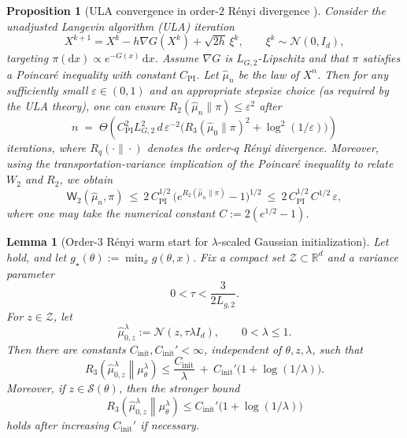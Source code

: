 \documentclass{article}
\theoremstyle{normaltheorem}
\newtheorem{lemma}[lemma]{Lemma}
\newtheorem{proposition}[proposition]{Proposition}
\newcommand{\gibbs}{\mu}
\newcommand{\R}{\mathbb{R}}
\newcommand{\calS}{\mathcal{S}}
\begin{document}
\begin{proposition}[ULA convergence in order-$2$ R\'enyi divergence {\citep[Prop.~5.6]{masiha2025superquantile}}]\label{prop:lmc-renyi}
Consider the unadjusted Langevin algorithm (ULA) iteration
\[
X^{k+1}=X^{k}-h\nabla G(X^{k})+\sqrt{2h}\,\xi^{k},
\qquad \xi^{k}\sim\mathcal N(0,I_d),
\]
targeting $\pi(\mathrm dx)\propto e^{-G(x)}\,\mathrm dx$.
Assume $\nabla G$ is $L_{G,2}$-Lipschitz and that $\pi$ satisfies a Poincar\'e inequality with constant $C_{\mathrm{PI}}$.
Let $\widehat\mu_n$ be the law of $X^{n}$.
Then for any sufficiently small $\varepsilon\in(0,1)$ and an appropriate stepsize choice (as required by the ULA theory),
one can ensure $R_2(\widehat\mu_n\|\pi)\le \varepsilon^2$ after
\begin{equation}\label{eq:lmc-renyi-steps}
n \;=\; \Theta\!\left(
C_{\mathrm{PI}}^{2}L_{G,2}^{2}\,d\,\varepsilon^{-2}\Big(R_3(\widehat\mu_0\|\pi)^2+\log^2(1/\varepsilon)\Big)
\right)
\end{equation}
iterations, where $R_q(\cdot\|\cdot)$ denotes the order-$q$ R\'enyi divergence.
Moreover, using the transportation-variance implication of the Poincar\'e inequality \citep{liu2020poincare} to relate
\(W_2\) and \(R_2\), we obtain
\begin{equation}\label{eq:lmc-w2-from-renyi}
\mathsf W_2(\widehat\mu_n,\pi)
\ \le\ 2\,C_{\mathrm{PI}}^{1/2}\,\big(e^{R_2(\widehat\mu_n\|\pi)}-1\big)^{1/2}
\ \le\ 2\,C_{\mathrm{PI}}^{1/2}\,C^{1/2}\,\varepsilon,
\end{equation}
where one may take the numerical constant $C:=2(e^{1/2}-1)$.
\end{proposition}

\begin{lemma}[Order-$3$ R\'enyi warm start for \(\lambda\)-scaled Gaussian initialization]\label{lem:gaussian-init-r3}
Let  hold, and let \(g_\star(\theta):=\min_x g(\theta,x)\).
Fix a compact set \(\mathcal Z\subset\R^d\) and a variance parameter
\[
0<\tau<\frac{3}{2L_{g,2}}.
\]
For \(z\in\mathcal Z\), let
\[
\widehat\mu_{0,z}^{\lambda}:=\mathcal N(z,\tau\lambda I_d),
\qquad
0<\lambda\le1.
\]
Then there are constants \(C_{\mathrm{init}},C_{\mathrm{init}}'<\infty\), independent of
\(\theta,z,\lambda\), such that
\begin{equation}\label{eq:gaussian-init-r3}
R_3\!\left(\widehat\mu_{0,z}^{\lambda}\middle\|\gibbs_\theta^\lambda\right)
\le
\frac{C_{\mathrm{init}}}{\lambda}
\ +\ C_{\mathrm{init}}'\bigl(1+\log(1/\lambda)\bigr).
\end{equation}
Moreover, if \(z\in\calS(\theta)\), then the stronger bound
\begin{equation}\label{eq:gaussian-init-r3-ons}
R_3\!\left(\widehat\mu_{0,z}^{\lambda}\middle\|\gibbs_\theta^\lambda\right)
\le
C_{\mathrm{init}}'\bigl(1+\log(1/\lambda)\bigr)
\end{equation}
holds after increasing \(C_{\mathrm{init}}'\) if necessary.
\end{lemma}
\end{document}
